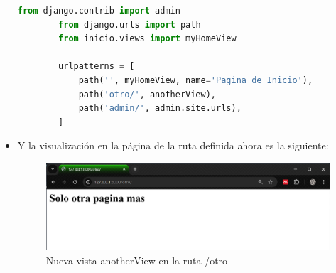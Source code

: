 \documentclass{article}
\begin{document}
\begin{itemize}
        \begin{lstlisting}[language=Python, caption={Asignación de la vista anotherView a la ruta /otro/}]
        from django.contrib import admin
        from django.urls import path
        from inicio.views import myHomeView
        
        urlpatterns = [
            path('', myHomeView, name='Pagina de Inicio'),
            path('otro/', anotherView),
            path('admin/', admin.site.urls),
        ]
        \end{lstlisting}
            \item Y la visualización en la página de la ruta definida ahora es la siguiente:
        \begin{figure}[H]
            \centering
            \includegraphics[width=1\linewidth]{img/Otro.png}
            \caption{Nueva vista anotherView en la ruta /otro}
            \label{fig:enter-label}
        \end{figure}
        \end{itemize}
\end{document}
